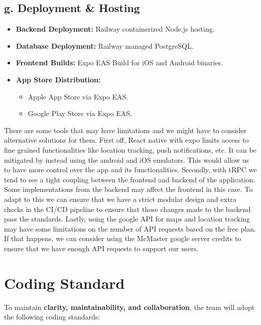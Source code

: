 \documentclass{article}
\begin{document}
\subsection*{g. Deployment \& Hosting}
\begin{itemize}
    \item \textbf{Backend Deployment:} Railway containerized Node.js hosting.
    \item \textbf{Database Deployment:} Railway managed PostgreSQL.
    \item \textbf{Frontend Builds:} Expo EAS Build for iOS and Android binaries.
    \item \textbf{App Store Distribution:}
    \begin{itemize}
        \item Apple App Store via Expo EAS.
        \item Google Play Store via Expo EAS.
    \end{itemize}
\end{itemize}

There are some tools that may have limitations and we might have to consider alternative solutions for them.
  First off, React native with expo limits access to fine grained functionalities like location tracking, push notifications, etc. 
  It can be mitigated by instead using the android and iOS emulators. This would allow us to have more control over the app and its functionalities.
  Secondly, with tRPC we tend to see a tight coupling between the frontend and backend of the application. 
  Some implementations from the backend may affect the frontend in this case. 
  To adapt to this we can ensure that we have a strict modular design and extra checks in 
  the CI/CD pipeline to ensure that those changes made to the backend pass the standards. 
  Lastly, using the google API for maps and location tracking 
  may have some limitations on the number of API requests based on the free plan. If
  that happens, we can consider using the McMaster google server credits to ensure
  that we have enough API requests to support our users.

\section{Coding Standard}


To maintain \textbf{clarity, maintainability, and collaboration}, the team will adopt the following coding standards:
\end{document}
